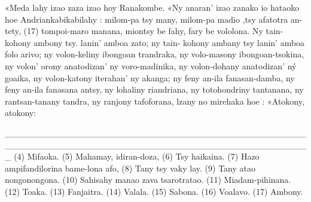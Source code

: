 «Meda lahy izao zaza izao hoy Ranakombe. «Ny anaran' izao
zanako io hataoko hoe Andriankabikabilahy : milom-pa tsy many, milom-pa
madio ,tsy afatotra an-tety, (17) tompoi-maro manana, miontsy be fahy,
fary be vololona. Ny tain-kohony ambony tsy. lanin' amboa zato; ny tain-
kohony ambany tsy lanin' amboa folo arivo; ny volon-keliny ibongoan
trandraka, ny volo-masony ibongoan-tsokina, ny volon' orony anatodizan'
ny voro-madinika, ny volon-dohany anatodizan' ný goaika, ny volon-katony
iterahan' ny akanga; ny feny an-ila fanasan-damba, ny feny an-ila fanasana
antsy, ny lohaliny riandriana, ny totohondriny tantanana, ny rantsan-tanany
tandra, ny ranjony tafoforana, lzany no mirehaka hoe : «Atokony, atokony:

_________________________________________________________________________________________________
(4) Mifaoka. 
(5) Mahamay, idiran-doza, 
(6) Tsy haikaina. 
(7) Hazo ampifandilorina bame-lona afo, 
(8) Tany tsy vaky lay. 
(9) Tany atao nongonongona. 
(10) Sahisahy manao zava tsarotratao. 
(11) Miadam-pihinana. 
(12) Toaka. 
(13) Fanjaitra. 
(14) Valala. 
(15) Sabona.
(16) Voalavo. 
(17) Ambony.